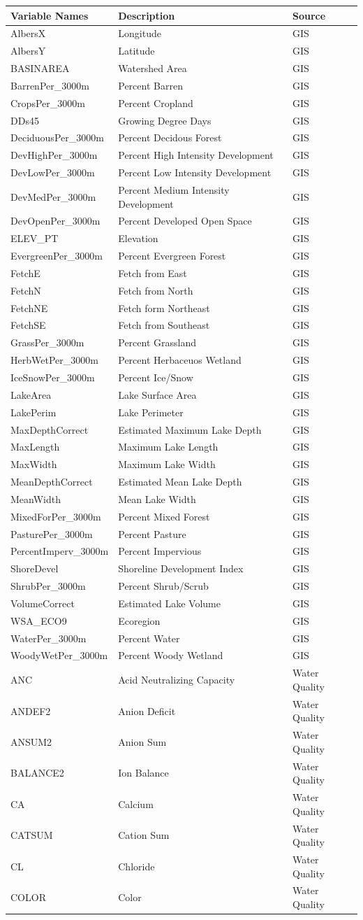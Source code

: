 \documentclass[12pt,]{article}
\begin{document}
\begin{longtable}[c]{@{}lll@{}}
\toprule
Variable Names & Description & Source\tabularnewline
\midrule
\endhead
AlbersX & Longitude & GIS\tabularnewline
AlbersY & Latitude & GIS\tabularnewline
BASINAREA & Watershed Area & GIS\tabularnewline
BarrenPer\_3000m & Percent Barren & GIS\tabularnewline
CropsPer\_3000m & Percent Cropland & GIS\tabularnewline
DDs45 & Growing Degree Days & GIS\tabularnewline
DeciduousPer\_3000m & Percent Decidous Forest & GIS\tabularnewline
DevHighPer\_3000m & Percent High Intensity Development &
GIS\tabularnewline
DevLowPer\_3000m & Percent Low Intensity Development &
GIS\tabularnewline
DevMedPer\_3000m & Percent Medium Intensity Development &
GIS\tabularnewline
DevOpenPer\_3000m & Percent Developed Open Space & GIS\tabularnewline
ELEV\_PT & Elevation & GIS\tabularnewline
EvergreenPer\_3000m & Percent Evergreen Forest & GIS\tabularnewline
FetchE & Fetch from East & GIS\tabularnewline
FetchN & Fetch from North & GIS\tabularnewline
FetchNE & Fetch form Northeast & GIS\tabularnewline
FetchSE & Fetch from Southeast & GIS\tabularnewline
GrassPer\_3000m & Percent Grassland & GIS\tabularnewline
HerbWetPer\_3000m & Percent Herbaceuos Wetland & GIS\tabularnewline
IceSnowPer\_3000m & Percent Ice/Snow & GIS\tabularnewline
LakeArea & Lake Surface Area & GIS\tabularnewline
LakePerim & Lake Perimeter & GIS\tabularnewline
MaxDepthCorrect & Estimated Maximum Lake Depth & GIS\tabularnewline
MaxLength & Maximum Lake Length & GIS\tabularnewline
MaxWidth & Maximum Lake Width & GIS\tabularnewline
MeanDepthCorrect & Estimated Mean Lake Depth & GIS\tabularnewline
MeanWidth & Mean Lake Width & GIS\tabularnewline
MixedForPer\_3000m & Percent Mixed Forest & GIS\tabularnewline
PasturePer\_3000m & Percent Pasture & GIS\tabularnewline
PercentImperv\_3000m & Percent Impervious & GIS\tabularnewline
ShoreDevel & Shoreline Development Index & GIS\tabularnewline
ShrubPer\_3000m & Percent Shrub/Scrub & GIS\tabularnewline
VolumeCorrect & Estimated Lake Volume & GIS\tabularnewline
WSA\_ECO9 & Ecoregion & GIS\tabularnewline
WaterPer\_3000m & Percent Water & GIS\tabularnewline
WoodyWetPer\_3000m & Percent Woody Wetland & GIS\tabularnewline
ANC & Acid Neutralizing Capacity & Water Quality\tabularnewline
ANDEF2 & Anion Deficit & Water Quality\tabularnewline
ANSUM2 & Anion Sum & Water Quality\tabularnewline
BALANCE2 & Ion Balance & Water Quality\tabularnewline
CA & Calcium & Water Quality\tabularnewline
CATSUM & Cation Sum & Water Quality\tabularnewline
CL & Chloride & Water Quality\tabularnewline
COLOR & Color & Water Quality\tabularnewline

\end{longtable}
\end{document}
